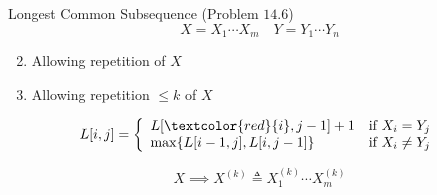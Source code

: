 \begin{frame}{}
  \begin{exampleblock}{Longest Common Subsequence (Problem $14.6$)}
    \[
      X = X_{1} \cdots X_{m} \quad Y = Y_{1} \cdots Y_{n}
    \]

    \begin{enumerate}[(1)]
      \setcounter{enumi}{1}
      \item Allowing repetition of $X$
      \item Allowing repetition $\le k$ of $X$
    \end{enumerate}
  \end{exampleblock}

  \pause
  \begin{displaymath}
    L[i,j] = \left\{ \begin{array}{ll}
      L[\textcolor{red}{i}, j-1] + 1 & \textrm{if $X_{i} = Y_{j}$}\\
      \max \set{L[i-1,j], L[i,j-1]} & \textrm{if $X_{i} \neq Y_{j}$}
    \end{array} \right.
  \end{displaymath}

  \pause
  \[
    X \implies X^{(k)} \triangleq X_{1}^{(k)} \cdots X_{m}^{(k)}
  \]
\end{frame}

